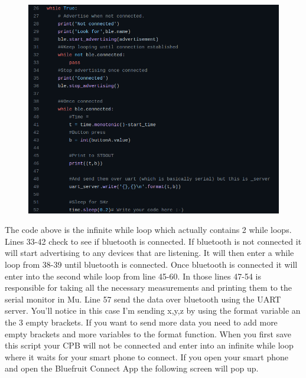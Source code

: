 \begin{figure}[H]
  \begin{center}
    \includegraphics[width=\textwidth]{Figures/bluetooth_code1.png}
  \end{center}
\end{figure}
The code above is the infinite while loop which actually contains 2 while loops. Lines 33-42 check to see if bluetooth is connected. If bluetooth is not connected it will start advertising to any devices that are listening. It will then enter a while loop from 38-39 until bluetooth is connected. Once bluetooth is connected it will enter into the second while loop from line 45-60. In those lines 47-54 is responsible for taking all the necessary measurements and printing them to the serial monitor in Mu. Line 57 send the data over bluetooth using the UART server. You'll notice in this case I'm sending x,y,z by using the format variable an the 3 empty {} brackets. If you want to send more data you need to add more empty brackets and more variables to the format function. When you first save this script your CPB will not be connected and enter into an infinite while loop where it waits for your smart phone to connect. If you open your smart phone and open the Bluefruit Connect App the following screen will pop up.
